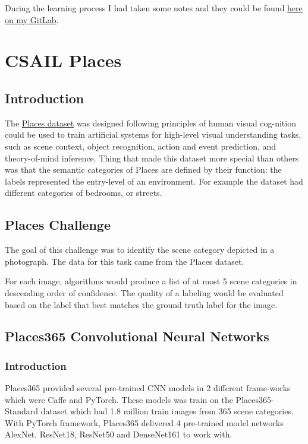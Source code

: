 During the learning process I had taken some notes and they could be found \href{https://gitlab.com/tlvu2697/epfl--ee559--deep-learning}{here on my GitLab}.

\section{CSAIL Places}
\subsection{Introduction}
The \href{http://places2.csail.mit.edu/}{Places dataset} was designed following principles of human visual cog-nition could be used to train artificial systems for high-level visual understanding tasks, such as scene context, object recognition, action and event prediction, and theory-of-mind inference. Thing that made this dataset more special than others was that the semantic categories of Places are defined by their function: the labels represented the entry-level of an environment. For example the dataset had different categories of bedrooms, or streets.

\subsection{Places Challenge}
The goal of this challenge was to identify the scene category depicted in a photograph. The data for this task came from the Places dataset.

For each image, algorithms would produce a list of at most 5 scene categories in descending order of confidence. The quality of a labeling would be evaluated based on the label that best matches the ground truth label for the image.

\subsection{Places365 Convolutional Neural Networks}
\subsubsection{Introduction}
Places365\cite{places365} provided several pre-trained CNN models in 2 different frame-works which were Caffe\cite{caffe} and PyTorch\cite{pytorch}. These models was train on the Places365-Standard dataset which had 1.8 million train images from 365 scene categories. With PyTorch framework, Places365 delivered 4 pre-trained model networks AlexNet\cite{alexnet}, ResNet18\cite{resnet}, ResNet50 and DenseNet161\cite{densenet} to work with.

